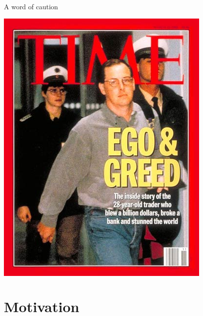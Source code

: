 \documentclass[12pt,aspectratio=169]{beamer}
\begin{document}
\begin{frame}{A word of caution}
{\begin{center}
            \includegraphics[height=0.8\textheight]{figures/leeson_time_cover}
        \end{center}}
\end{frame}

\section{Motivation}
\end{document}
